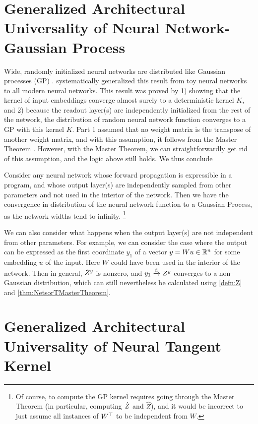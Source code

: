 \documentclass[main.tex]{subfiles}
\begin{document}
\section{Generalized Architectural Universality of Neural Network-Gaussian Process}
\label{sec:NNGP}

Wide, randomly initialized neural networks are distributed like Gaussian processes (GP) \citep{neal_bayesian_1995,lee_deep_2018,matthews_gaussian_2018_arxiv,novak_bayesian_2018,garriga-alonso_deep_2018,yangTP1}.
\citet{yangTP1} systematically generalized this result from toy neural networks to all modern neural networks.
This result was proved by 1) showing that the kernel of input embeddings converge almost surely to a deterministic kernel $K$, and 2) because the readout layer(s) are independently initialized from the rest of the network, the distribution of random neural network function converges to a GP with this kernel $K$. Part 1 assumed that no weight matrix is the transpose of another weight matrix, and with this assumption, it follows from the \netsor{} Master Theorem \citep{yangTP1}. However, with the \netsort{} Master Theorem, we can straightforwardly get rid of this assumption, and the logic above still holds. We thus conclude
\begin{thm}
Consider any neural network whose forward propagation is expressible in a \netsort{} program, and whose output layer(s) are independently sampled from other parameters and not used in the interior of the network. Then we have the convergence in distribution of the neural network function to a Gaussian Process, as the network widths tend to infinity.%
\footnote{Of course, to compute the GP kernel requires going through the \netsort{} Master Theorem (in particular, computing $\dot Z$ and $\hat{Z}$), and it would be incorrect to just assume all instances of $W^{\top}$ to be independent from $W$.
}
\end{thm}

We can also consider what happens when the output layer(s) are not independent from other parameters. For example, we can consider the case where the output can be expressed as the first coordinate $y_{1}$ of a vector $y=Wu\in\mathbb{R}^{n}$ for some embedding $u$ of the input. Here $W$ could have been used in the interior of the network. Then in general, $\dot Z^{y}$ is nonzero, and $y_{1}\xrightarrow{\mathrm{d}} Z^{y}$ converges to a non-Gaussian distribution, which can still nevertheless be calculated using \cref{defn:Z} and \cref{thm:NetsorTMasterTheorem}.

\section{Generalized Architectural Universality of Neural Tangent Kernel}
\label{sec:generalizedNTK4A}
\end{document}
